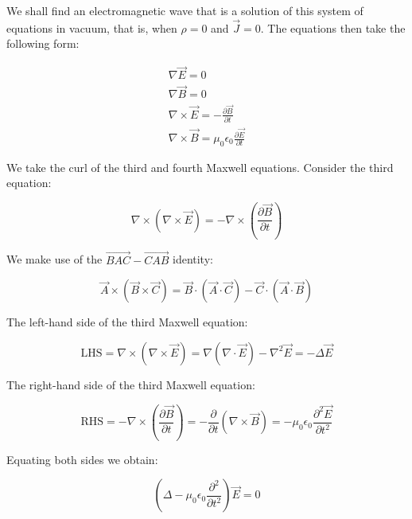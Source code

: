 We shall find an electromagnetic wave that is a solution of this system of equations in vacuum, that is, when $\rho = 0$ and $\vec{J} = 0$. The equations then take the following form:

\begin{equation}
    \begin{matrix}
    \nabla \vec{E} = 0\\
    \nabla \vec{B} = 0\\
    \nabla\times\vec{E} = -\frac{\partial \vec{B}}{\partial t}\\
    \nabla\times\vec{B} = \mu_{0}\epsilon_{0}\frac{\partial\vec{E}}{\partial t}
    \end{matrix}
\end{equation}

We take the curl of the third and fourth Maxwell equations. Consider the third equation:

\begin{equation}
    \nabla\times\left(\nabla\times\vec{E}\right) = -\nabla\times\left(\frac{\partial\vec{B}}{\partial t}\right)
\end{equation}

We make use of the $\vec{BAC}-\vec{CAB}$ identity:

\begin{equation}
    \vec{A}\times\left(\vec{B}\times\vec{C}\right) = \vec{B}\cdot\left(\vec{A}\cdot\vec{C}\right) - \vec{C}\cdot\left(\vec{A}\cdot\vec{B}\right)
\end{equation}

The left-hand side of the third Maxwell equation:

\begin{equation}
    \mathrm{LHS} = \nabla\times\left(\nabla\times\vec{E}\right) = \nabla\left(\nabla\cdot\vec{E}\right) - \nabla^{2}\vec{E} = -\Delta\vec{E}
\end{equation}

The right-hand side of the third Maxwell equation:

\begin{equation}
    \mathrm{RHS} = -\nabla\times\left(\frac{\partial\vec{B}}{\partial t}\right) = - \frac{\partial}{\partial t}\left(\nabla\times\vec{B}\right) = -\mu_{0}\epsilon_{0}\frac{\partial^{2}\vec{E}}{\partial t^{2}}
\end{equation}

Equating both sides we obtain:

\begin{equation}
    \left(\Delta - \mu_{0}\epsilon_{0}\frac{\partial^{2}}{\partial t^{2}}\right)\vec{E} = 0
\end{equation}

